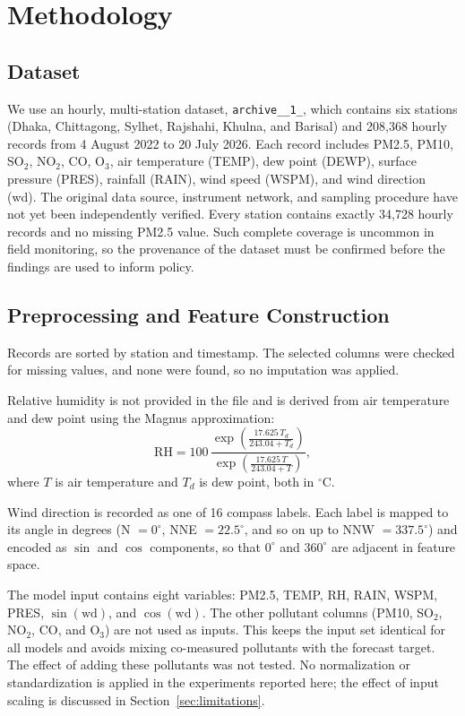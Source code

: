 \documentclass[conference]{IEEEtran}
\begin{document}
\section{Methodology}

\subsection{Dataset}
We use an hourly, multi-station dataset, \texttt{archive\_\_1\_}, which contains six stations (Dhaka, Chittagong, Sylhet, Rajshahi, Khulna, and Barisal) and 208,368 hourly records from 4 August 2022 to 20 July 2026. Each record includes PM2.5, PM10, SO\(_2\), NO\(_2\), CO, O\(_3\), air temperature (TEMP), dew point (DEWP), surface pressure (PRES), rainfall (RAIN), wind speed (WSPM), and wind direction (wd). The original data source, instrument network, and sampling procedure have not yet been independently verified. Every station contains exactly 34,728 hourly records and no missing PM2.5 value. Such complete coverage is uncommon in field monitoring, so the provenance of the dataset must be confirmed before the findings are used to inform policy.

\subsection{Preprocessing and Feature Construction}
Records are sorted by station and timestamp. The selected columns were checked for missing values, and none were found, so no imputation was applied.

Relative humidity is not provided in the file and is derived from air temperature and dew point using the Magnus approximation:
\begin{equation}
\mathrm{RH} = 100\,\frac{\exp\!\left(\frac{17.625\,T_d}{243.04+T_d}\right)}{\exp\!\left(\frac{17.625\,T}{243.04+T}\right)},
\end{equation}
where \(T\) is air temperature and \(T_d\) is dew point, both in \(^\circ\)C.

Wind direction is recorded as one of 16 compass labels. Each label is mapped to its angle in degrees (N \(=0^\circ\), NNE \(=22.5^\circ\), and so on up to NNW \(=337.5^\circ\)) and encoded as \(\sin\) and \(\cos\) components, so that \(0^\circ\) and \(360^\circ\) are adjacent in feature space.

The model input contains eight variables: PM2.5, TEMP, RH, RAIN, WSPM, PRES, \(\sin(\mathrm{wd})\), and \(\cos(\mathrm{wd})\). The other pollutant columns (PM10, SO\(_2\), NO\(_2\), CO, and O\(_3\)) are not used as inputs. This keeps the input set identical for all models and avoids mixing co-measured pollutants with the forecast target. The effect of adding these pollutants was not tested. No normalization or standardization is applied in the experiments reported here; the effect of input scaling is discussed in Section~\ref{sec:limitations}.
\end{document}

